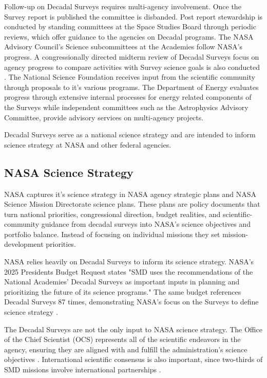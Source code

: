 \documentclass[preprint,12pt]{elsarticle}
\begin{document}
Follow-up on Decadal Surveys requires multi-agency involvement. Once the Survey report is published the committee is disbanded. Post report stewardship is conducted by standing committees at the Space Studies Board through periodic reviews, which offer guidance to the agencies on Decadal programs. The NASA Advisory Council's Science subcommittees at the Academies follow NASA's progress. A congressionally directed midterm review of Decadal Surveys focus on agency progress to compare activities with Survey science goals is also conducted \cite{congress2005nasa}. The National Science Foundation receives input from the scientific community through proposals to it's various programs. The Department of Energy evaluates progress through extensive internal processes for energy related components of the Surveys while independent committees such as the Astrophysics Advisory Committee, provide advisory services on multi-agency projects.

Decadal Surveys serve as a national science strategy and are intended to inform science strategy at NASA and other federal agencies. 

\subsection{NASA Science Strategy}
NASA captures it's science strategy in NASA agency strategic plans and NASA Science Mission Directorate science plans. These plans are policy documents that turn national priorities, congressional direction, budget realities, and scientific-community guidance from decadal surveys into NASA's science objectives and portfolio balance. Instead of focusing on individual missions they set mission-development priorities. 

NASA relies heavily on Decadal Surveys to inform its science strategy. NASA's 2025 Presidents Budget Request states "SMD uses the recommendations of the National Academies' Decadal Surveys as important inputs in planning and prioritizing the future of its science programs." The same budget references Decadal Surveys 87 times, demonstrating NASA's focus on the Surveys to define science strategy \cite{NASA2025budget}. 

The Decadal Surveys are not the only input to NASA science strategy. The Office of the Chief Scientist (OCS) represents all of the scientific endeavors in the agency, ensuring they are aligned with and fulfill the administration's science objectives \cite{nasa_partnerships_2024}. International scientific consensus is also important, since two-thirds of SMD missions involve international partnerships \cite{nasa_smd_hearing_2024}. 
 
\end{document}
